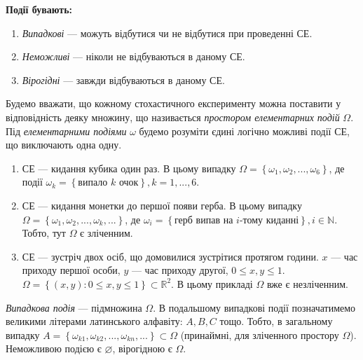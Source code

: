 \noindent \textbf{Події бувають:}
\begin{enumerate}
    \item \emph{Випадкові} --- можуть відбутися чи не відбутися при проведенні СЕ.
    \item \emph{Неможливі} --- ніколи не відбуваються в даному СЕ.
    \item \emph{Вірогідні} --- завжди відбуваються в даному СЕ.
\end{enumerate}
\begin{definition}
    Будемо вважати, що кожному стохастичного експерименту можна поставити у відповідність деяку множину, що
    називається \emph{простором елементарних подій} $\Omega$. 
    Під \emph{елементарними подіями} $\omega$ будемо розуміти єдині
    логічно можливі події СЕ, що виключають одна одну.
\end{definition}
\begin{example}
    \begin{enumerate}
        \item СЕ --- кидання кубика один раз. В цьому випадку
        $\Omega = \left\{\omega_1, \omega_2, ..., \omega_6\right\}$, 
        де події 
        $\omega_k = \left\{\text{випало } k \text{ очок}\right\}, k = 1,...,6$.
        \item СЕ --- кидання монетки до першої появи герба. В цьому випадку
        $\Omega = \left\{\omega_1, \omega_2, ..., \omega_k, ...\right\}$,  
        де $\omega_i = \left\{\text{герб випав на }i\text{-тому киданні}\right\}, i\in \mathbb{N}$.
        Тобто, тут $\Omega$ є зліченним.
        \item СЕ --- зустріч двох осіб, що домовилися зустрітися протягом години.
        $x$ --- час приходу першої особи, $y$ --- час приходу другої, $0\leq x, y \leq 1$.
        $\Omega = \left\{ \left( x, y\right): 0\leq x, y \leq 1\right\}\subset \mathbb{R}^2$.
        В цьому прикладі $\Omega$ вже є незліченним.
    \end{enumerate}
\end{example}
\begin{definition}
    \emph{Випадкова подія} --- підмножина $\Omega$. В подальшому випадкові події позначатимемо великими літерами латинського алфавіту: $A, B, C$ тощо.
    Тобто, в загальному випадку $A = \left\{\omega_{k1}, \omega_{k2}, ..., \omega_{kn}, ...\right\} \subset \Omega$
    (принаймні, для зліченного простору $\Omega$).
    Неможливою подією є $\varnothing$, вірогідною є $\Omega$. 
\end{definition}

